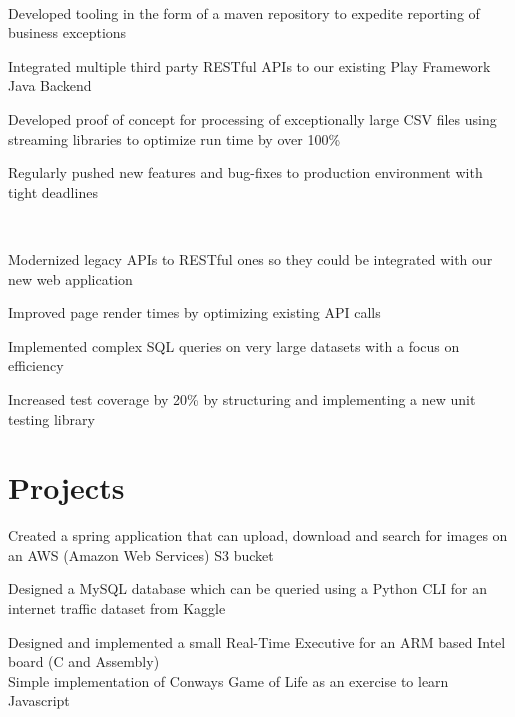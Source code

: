 \documentclass[]{hieudo-build}
\begin{document}
\begin{minipage}[t]{1.0\textwidth}
 \\
\begin{tightemize}
\item Developed tooling in the form of a maven repository to expedite reporting of business exceptions
\item Integrated multiple third party RESTful APIs to our existing Play Framework Java Backend
\item Developed proof of concept for processing of exceptionally large CSV files using streaming libraries to optimize run time by over 100\% 
\item Regularly pushed new features and bug-fixes to production environment with tight deadlines
\end{tightemize}
\sectionsep

 \\
\begin{tightemize}
\item Modernized legacy APIs to RESTful ones so they could be integrated with our new web application
\item Improved page render times by optimizing existing API calls
\item Implemented complex SQL queries on very large datasets with a focus on efficiency 
\item  Increased test coverage by 20\% by structuring and implementing a new unit testing library
\end{tightemize}
\sectionsep


\sectionsep

\section{Projects}

\descript{}
Created a spring application that can upload, download and search for images on an AWS (Amazon Web Services) S3 bucket

\descript{}
Designed a MySQL database which can be queried using a Python CLI for an internet traffic dataset from Kaggle

\descript{}
Designed and implemented a small Real-Time Executive for an ARM based Intel board (C and Assembly)\\

\descript{}
Simple implementation of Conways Game of Life as an exercise to learn Javascript






\end{minipage} 
\end{document}
